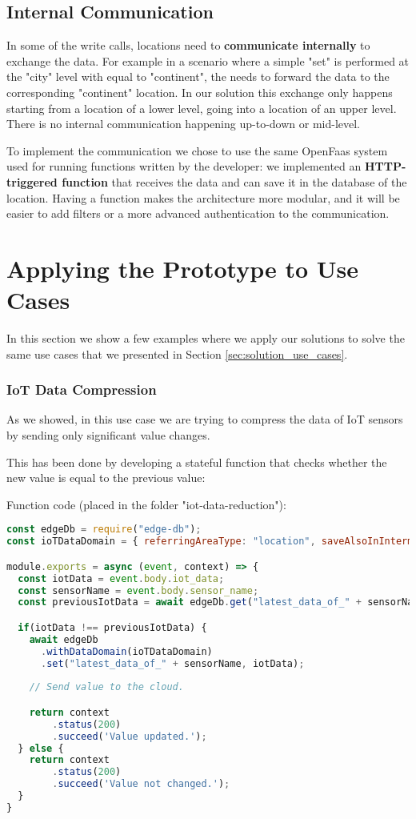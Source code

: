 \subsection{Internal Communication}
In some of the write calls, locations need to \textbf{communicate internally} to exchange the data. For example in a scenario where a simple "set" is performed at the "city" level with  equal to "continent", the  needs to forward the data to the corresponding "continent" location. In our solution this exchange only happens starting from a location of a lower level, going into a location of an upper level. There is no internal communication happening up-to-down or mid-level.

To implement the communication we chose to use the same OpenFaas system used for running functions written by the developer: we implemented an \textbf{HTTP-triggered function} that receives the data and can save it in the database of the location.
Having a function makes the architecture more modular, and it will be easier to add filters or a more advanced authentication to the communication.


\section{Applying the Prototype to Use Cases}
\label{sec:prototype_applying_to_use_cases}
In this section we show a few examples where we apply our solutions to solve the same use cases that we presented in Section \ref{sec:solution_use_cases}.

\subsubsection{IoT Data Compression}
As we showed, in this use case we are trying to compress the data of IoT sensors by sending only significant value changes.

This has been done by developing a stateful function that checks whether the new value is equal to the previous value:

Function code (placed in the folder "iot-data-reduction"):
\begin{lstlisting}[language=javascript]
const edgeDb = require("edge-db");
const ioTDataDomain = { referringAreaType: "location", saveAlsoInIntermediateLevels: false, ttl: 5*24*60*60*1000 }; // 5 days TTL.

module.exports = async (event, context) => {
  const iotData = event.body.iot_data;
  const sensorName = event.body.sensor_name;
  const previousIotData = await edgeDb.get("latest_data_of_" + sensorName);

  if(iotData !== previousIotData) {
    await edgeDb
      .withDataDomain(ioTDataDomain)
      .set("latest_data_of_" + sensorName, iotData);
        
    // Send value to the cloud.

    return context
        .status(200)
        .succeed('Value updated.');
  } else {
    return context
        .status(200)
        .succeed('Value not changed.');
  }
}
\end{lstlisting}

